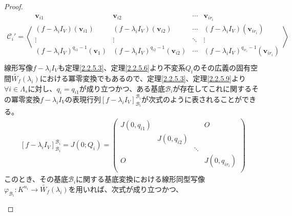 \documentclass[dvipdfmx]{jsarticle}
\begin{document}
\begin{proof}
\begin{align*}
\mathcal{C}_{i}' = \left\langle \begin{matrix}
\mathbf{v}_{i1} & \mathbf{v}_{i2} & \cdots & \mathbf{v}_{ir_{i}} \\
\left( f - \lambda_{i}I_{V} \right)\left( \mathbf{v}_{i1} \right) & \left( f - \lambda_{i}I_{V} \right)\left( \mathbf{v}_{i2} \right) & \cdots & \left( f - \lambda_{i}I_{V} \right)\left( \mathbf{v}_{ir_{i}} \right) \\
 \vdots & \vdots & \ddots & \vdots \\
\left( f - \lambda_{i}I_{V} \right)^{q_{i1} - 1}\left( \mathbf{v}_{1} \right) & \left( f - \lambda_{i}I_{V} \right)^{q_{i2} - 1}\left( \mathbf{v}_{i2} \right) & \cdots & \left( f - \lambda_{i}I_{V} \right)^{q_{ir_{i}} - 1}\left( \mathbf{v}_{ir_{i}} \right) \\
\end{matrix} \right\rangle
\end{align*}
線形写像$f - \lambda_{i}I_{V}$も定理\ref{2.2.5.3}、定理\ref{2.2.5.6}より不変系$Q_{i}$のその広義の固有空間$\widetilde{W_{f}}\left( \lambda_{i} \right)$における冪零変換でもあるので、定理\ref{2.2.5.3}、定理\ref{2.2.5.9}より$\forall i \in \varLambda_{s}$に対し、$q_{i} = q_{i1}$が成り立つかつ、ある基底$\mathcal{B}_{i}$が存在してこれに関するその冪零変換$f - \lambda_{i}I_{V}$の表現行列$\left[f - \lambda_{i}I_{V} \right]_{\mathcal{B}_{i}}^{\mathcal{B}_{i}}$が次式のように表されることができる。
\begin{align*}
\left[f - \lambda_{i}I_{V} \right]_{\mathcal{B}_{i}}^{\mathcal{B}_{i}} = J\left( 0;Q_{i} \right) = \begin{pmatrix}
J\left( 0,q_{i1} \right) & \  & \  & O \\
\  & J\left( 0,q_{i2} \right) & \  & \  \\
\  & \  & \ddots & \  \\
O & \  & \  & J\left( 0,q_{ir_{i}} \right) \\
\end{pmatrix}
\end{align*}
このとき、その基底$\mathcal{B}_{i}$に関する基底変換における線形同型写像$\varphi_{\mathcal{B}_{i}}:K^{n_{i}} \rightarrow \widetilde{W_{f}}\left( \lambda_{i} \right)$を用いれば、次式が成り立つかつ、
\begin{center}
  \begin{tikzpicture}[auto]


\end{tikzpicture}
\end{center}
\end{proof}
\end{document}
